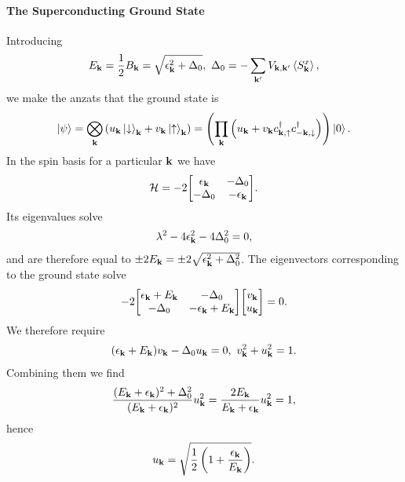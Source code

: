 \paragraph{The Superconducting Ground State}
Introducing
\begin{align*}
	E_{\vb{k}} = \frac{1}{2}B_{\vb{k}} = \sqrt{\epsilon_{\vb{k}}^{2} + \Delta_{0}},\ \Delta_{0} = -\sum\limits_{\vb{k}^{\prime}}V_{\vb{k}, \vb{k}^{\prime}}\expval{S_{\vb{k}}^{x}},
\end{align*}
we make the anzats that the ground state is
\begin{align*}
	\ket{\psi} = \bigotimes\limits_{\vb{k}}\left(u_{\vb{k}}\ket{\downarrow}_{\vb{k}} + v_{\vb{k}}\ket{\uparrow}_{\vb{k}}\right) = \left(\prod\limits_{\vb{k}}\left(u_{\vb{k}} + v_{\vb{k}}c_{\vb{k}, \uparrow}^{\dagger} c_{-\vb{k}, \downarrow}^{\dagger}\right)\right)\ket{0}.
\end{align*}
In the spin basis for a particular $\vb{k}$ we have
\begin{align*}
	\ham = -2\mqty[
		\epsilon_{\vb{k}}  & -\Delta_{0} \\
		-\Delta_{0}        & -\epsilon_{\vb{k}}
	].
\end{align*}
Its eigenvalues solve
\begin{align*}
	\lambda^{2} - 4\epsilon_{\vb{k}}^{2} - 4\Delta_{0}^{2} = 0,
\end{align*}
and are therefore equal to $\pm 2E_{\vb{k}} = \pm 2\sqrt{\epsilon_{\vb{k}}^{2} + \Delta_{0}^{2}}$. The eigenvectors corresponding to the ground state solve
\begin{align*}
	-2\mqty[
		\epsilon_{\vb{k}} + E_{\vb{k}} & -\Delta_{0} \\
		-\Delta_{0}                    & -\epsilon_{\vb{k}} + E_{\vb{k}}
	]\mqty[
		v_{\vb{k}} \\
		u_{\vb{k}}
	] = 0.
\end{align*}
We therefore require
\begin{align*}
	(\epsilon_{\vb{k}} + E_{\vb{k}})v_{\vb{k}} - \Delta_{0}u_{\vb{k}} = 0,\ v_{\vb{k}}^{2} + u_{\vb{k}}^{2} = 1.
\end{align*}
Combining them we find
\begin{align*}
	\frac{(E_{\vb{k}} + \epsilon_{\vb{k}})^{2} + \Delta_{0}^{2}}{(E_{\vb{k}} + \epsilon_{\vb{k}})^{2}}u_{\vb{k}}^{2} = \frac{2E_{\vb{k}}}{E_{\vb{k}} + \epsilon_{\vb{k}}}u_{\vb{k}}^{2} = 1,
\end{align*}
hence
\begin{align*}
	u_{\vb{k}} = \sqrt{\frac{1}{2}\left(1 + \frac{\epsilon_{\vb{k}}}{E_{\vb{k}}}\right)}.
\end{align*}
